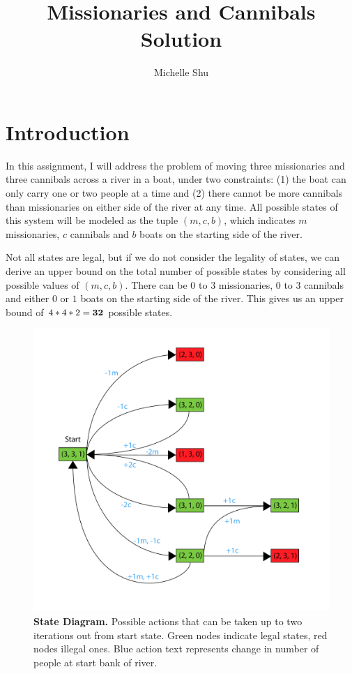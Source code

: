 \documentclass{article}
\title{Missionaries and Cannibals Solution}
\author{Michelle Shu}
\begin{document}
\maketitle

\section{Introduction}

In this assignment, I will address the problem of moving three missionaries and three cannibals across a river in a boat, under two constraints: (1) the boat can only carry one or two people at a time and (2) there cannot be more cannibals than missionaries on either side of the river at any time. All possible states of this system will be modeled as the tuple $(m, c, b)$, which indicates $m$ missionaries, $c$ cannibals and $b$ boats on the starting side of the river.

Not all states are legal, but if we do not consider the legality of states, we can derive an upper bound on the total number of possible states by considering all possible values of $(m, c, b)$. There can be $0$ to $3$ missionaries, $0$ to $3$ cannibals and either $0$ or $1$ boats on the starting side of the river. This gives us an upper bound of $4 * 4 * 2 = \bf{32}$ possible states.

\begin{figure}[!htb]
\centering
\includegraphics[scale=.45]{MCStates.pdf}
\caption{{\bf State Diagram.} Possible actions that can be taken up to two iterations out from start state. Green nodes indicate legal states, red nodes illegal ones. Blue action text represents change in number of people at start bank of river.}
\label{fig:MCStates}
\end{figure}
\end{document}
